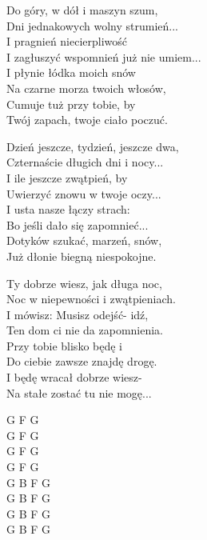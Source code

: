 \begin{text}
Do góry, w dół i maszyn szum,\\
Dni jednakowych wolny strumień...\\
I pragnień niecierpliwość\\
I zagłuszyć wspomnień już nie umiem...\\
\vin I płynie łódka moich snów\\
\vin Na czarne morza twoich włosów,\\
\vin Cumuje tuż przy tobie, by\\
\vin Twój zapach, twoje ciało poczuć. 

Dzień jeszcze, tydzień, jeszcze dwa,\\
Czternaście długich dni i nocy...\\
I ile jeszcze zwątpień, by\\
Uwierzyć znowu w twoje oczy...\\
\vin I usta nasze łączy strach:\\
\vin Bo jeśli dało się zapomnieć...\\
\vin Dotyków szukać, marzeń, snów,\\
\vin Już dłonie biegną niespokojne.

Ty dobrze wiesz, jak długa noc,\\
Noc w niepewności i zwątpieniach.\\
I mówisz: Musisz odejść- idź,\\
Ten dom ci nie da zapomnienia.\\
\vin Przy tobie blisko będę i\\
\vin Do ciebie zawsze znajdę drogę.\\
\vin I będę wracał dobrze wiesz-\\
\vin Na stałe zostać tu nie mogę...
\end{text}
\begin{chord}
G F G\\
G F G\\
G F G\\
G F G\\
G B F G\\
G B F G\\
G B F G\\
G B F G
\end{chord}